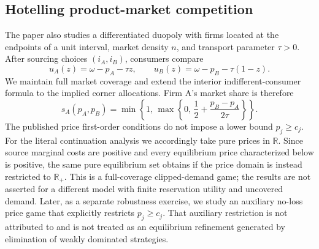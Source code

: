 \subsection{Hotelling product-market competition}

The paper also studies a differentiated duopoly with firms located at the endpoints of a unit interval, market density \(n\), and transport parameter \(\tau>0\).  After sourcing choices \((i_A,i_B)\), consumers compare
\[
u_A(z)=\omega-p_A-\tau z,
\qquad
u_B(z)=\omega-p_B-\tau(1-z).
\]
We maintain full market coverage and extend the interior indifferent-consumer formula to the implied corner allocations.  Firm A's market share is therefore
\begin{equation}
s_A(p_A,p_B)
=
\min\left\{
1,\,
\max\left\{
0,\,
\frac12+\frac{p_B-p_A}{2\tau}
\right\}
\right\}.
\label{eq:clipped-share}
\end{equation}
The published price first-order conditions do not impose a lower bound \(p_j\ge c_j\).  For the literal continuation analysis we accordingly take pure prices in \(\mathbb R\).  Since source marginal costs are positive and every equilibrium price characterized below is positive, the same pure equilibrium set obtains if the price domain is instead restricted to \(\mathbb R_+\).  This is a full-coverage clipped-demand game; the results are not asserted for a different model with finite reservation utility and uncovered demand.  Later, as a separate robustness exercise, we study an auxiliary no-loss price game that explicitly restricts \(p_j\ge c_j\).  That auxiliary restriction is not attributed to \cite{ShyStenbacka2005} and is not treated as an equilibrium refinement generated by elimination of weakly dominated strategies.
